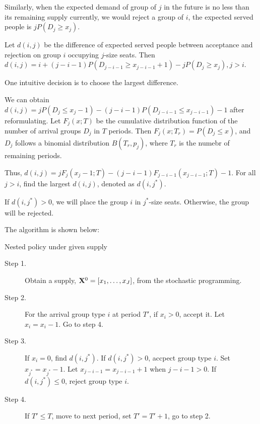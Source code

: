 Similarly, when the expected demand of group of $j$ in the future is no less than its remaining supply currently, we would reject a group of $i$, the expected served people is $j P(D_{j} \geq x_{j})$.

Let $d(i,j)$ be the difference of expected served people between acceptance and rejection on group $i$ occupying $j$-size seats. Then $d(i,j) = i + (j-i-1)P(D_{j-i-1} \geq x_{j-i-1}+1) - j P(D_{j} \geq x_{j}), j >i$.

One intuitive decision is to choose the largest difference.

We can obtain $d(i,j) = j P(D_{j} \leq x_{j} -1) - (j-i-1)P(D_{j-i-1} \leq x_{j-i-1}) -1$ after reformulating. 
Let $F_{j}(x;T)$ be the cumulative distribution function of the number of arrival groups $D_{j}$ in $T$ periods. Then $F_{j}(x; T_{r}) = P(D_{j} \leq x)$, and $D_{j}$ follows a binomial distribution $B(T_{r}, p_{j})$, where $T_{r}$ is the numebr of remaining periods.

Thus, $d(i,j) = j F_{j}(x_{j}-1; T) - (j-i-1) F_{j-i-1}(x_{j-i-1}; T) -1$. For all $j >i$, find the largest $d(i,j)$, denoted as $d(i,j^{*})$.

If $d(i,j^{*}) >0$, we will place the group $i$ in $j^{*}$-size seats. Otherwise, the group will be rejected.

The algorithm is shown below:

\begin{algorithm}[H]
  \caption{Nested policy under given supply}\label{algo_nested_policy}
  \begin{description}
    \item[Step 1.] Obtain a supply, $\mathbf{X}^{0} = [x_1,\ldots,x_{J}]$, from the stochastic programming.
    \item[Step 2.] For the arrival group type $i$ at period $T{'}$, if $x_{i} > 0$, accept it. Let $x_{i} = x_{i} -1$. Go to step 4.
    \item[Step 3.] If $x_{i} = 0$, find $d(i,j^{*})$. If $d(i,j^{*})>0$, accpect group type $i$. Set $x_{j^{*}} = x_{j^{*}} -1$. Let $x_{j-i-1} = x_{j-i-1} + 1$ when $j-i-1>0$. If $d(i,j^{*}) \leq 0$, reject group type $i$.
    \item[Step 4.] If $T{'} \leq T$, move to next period, set $T{'} = T{'}+1$, go to step 2.
  \end{description}
\end{algorithm}



